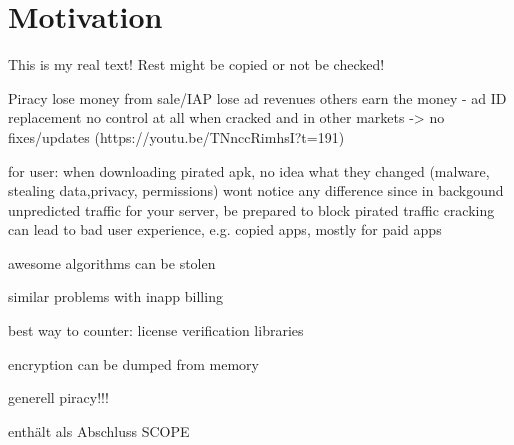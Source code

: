 \section{Motivation}\label{section:introduction-motivation}
This is my real text! Rest might be copied or not be checked!


Piracy\newline
lose money from sale/IAP\newline
lose ad revenues\newline
others earn the money  - ad ID replacement\newline
no control at all when cracked and in other markets -> no fixes/updates (https://youtu.be/TNnccRimhsI?t=191)\newline

for user: when downloading pirated apk, no idea what they changed (malware, stealing data,privacy, permissions)\newline
wont notice any difference since in backgound\newline
unpredicted traffic for your server, be prepared to block pirated traffic\newline
cracking can lead to bad user experience, e.g. copied apps, mostly for paid apps\newline

awesome algorithms can be stolen\newline

similar problems with inapp billing\newline

best way to counter: license verification libraries\newline

encryption can be dumped from memory\newline

generell piracy!!!\newline

enthält als Abschluss SCOPE\newline
